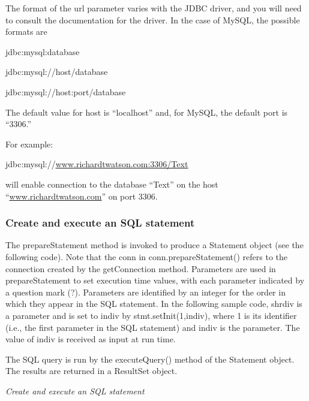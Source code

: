 \documentclass[
]{article}
\begin{document}
The format of the url parameter varies with the JDBC driver, and you
will need to consult the documentation for the driver. In the case of
MySQL, the possible formats are

jdbc:mysql:database

jdbc:mysql://host/database

jdbc:mysql://host:port/database

The default value for host is ``localhost'' and, for MySQL, the default
port is ``3306.''

For example:

jdbc:mysql://\href{http://www.richardtwatson.com:3306/Text}{\underline{www.richardtwatson.com:3306/Text}}

will enable connection to the database ``Text'' on the host
``\href{http://www.richardtwatson.com}{\underline{www.richardtwatson.com}}'' on port
3306.

\hypertarget{create-and-execute-an-sql-statement}{%
\subsubsection*{Create and execute an SQL statement}\label{create-and-execute-an-sql-statement}}

The prepareStatement method is invoked to produce a Statement object
(see the following code). Note that the conn in conn.prepareStatement()
refers to the connection created by the getConnection method. Parameters
are used in prepareStatement to set execution time values, with each
parameter indicated by a question mark (?). Parameters are identified by
an integer for the order in which they appear in the SQL statement. In
the following sample code, shrdiv is a parameter and is set to indiv by
stmt.setInit(1,indiv), where 1 is its identifier (i.e., the first
parameter in the SQL statement) and indiv is the parameter. The value of
indiv is received as input at run time.

The SQL query is run by the executeQuery() method of the Statement
object. The results are returned in a ResultSet object.

\emph{Create and execute an SQL statement}
\end{document}
